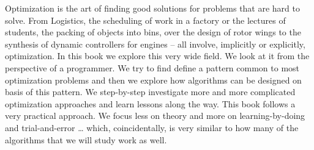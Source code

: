 %
Optimization is the art of finding good solutions for problems that are hard to solve.
From Logistics, the scheduling of work in a factory or the lectures of students, the packing of objects into bins, over the design of rotor wings to the synthesis of dynamic controllers for engines -- all involve, implicitly or explicitly, optimization.
In this book we explore this very wide field.
We look at it from the perspective of a programmer.
We try to find define a pattern common to most optimization problems and then we explore how algorithms can be designed on basis of this pattern.
We step-by-step investigate more and more complicated optimization approaches and learn lessons along the way.
This book follows a very practical approach.
We focus less on theory and more on learning-by-doing and trial-and-error {\dots} which, coincidentally, is very similar to how many of the algorithms that we will study work as well.
%

